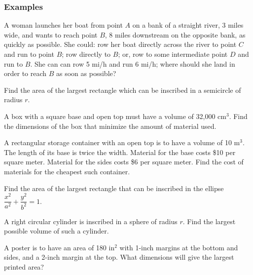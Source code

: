 \documentclass[notes]{subfiles}
\begin{document}
	\subsubsection*{Examples}
		\begin{ex}
			A woman launches her boat from point \(A\) on a bank of a straight river, 3 miles wide, and wants to reach point \(B\), 8 miles downstream on the opposite bank, as quickly as possible.  She could: row her boat directly across the river to point \(C\) and run to point \(B\); row directly to \(B\); or, row to some intermediate point \(D\) and run to \(B\).  She can can row 5 mi/h and run 6 mi/h; where should she land in order to reach \(B\) as soon as possible?
		\end{ex}
			
		\begin{ex}
			Find the area of the largest rectangle which can be inscribed in a semicircle of radius \(r\).
		\end{ex}
			\newpage
			
		\begin{ex}
			A box with a square base and open top must have a volume of 32,000 cm\(^3\).  Find the dimensions of the box that minimize the amount of material used.
		\end{ex}
			
		\begin{ex}
			A rectangular storage container with an open top is to have a volume of 10 m\(^3\).  The length of its base is twice the width.  Material for the base costs \$10 per square meter.  Material for the sides costs \$6 per square meter.  Find the cost of materials for the cheapest such container.
		\end{ex}
			\newpage
			
		\begin{ex}
			Find the area of the largest rectangle that can be inscribed in the ellipse \(\dfrac{x^2}{a^2}+\dfrac{y^2}{b^2} = 1\).
		\end{ex}
			
		\begin{ex}
			A right circular cylinder is inscribed in a sphere of radius \(r\).  Find the largest possible volume of such a cylinder.
		\end{ex}
			\newpage
			
		\begin{ex}
			A poster is to have an area of 180 in\(^2\) with 1-inch margins at the bottom and sides, and a 2-inch margin at the top.  What dimensions will give the largest printed area?
		\end{ex}
			
\end{document}
